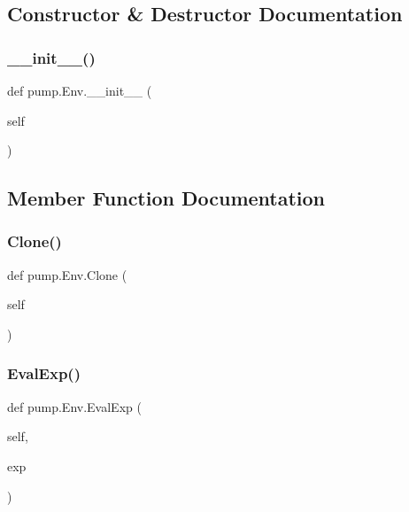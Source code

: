 \subsection{Constructor \& Destructor Documentation}
\mbox{\label{classpump_1_1_env_a803732618a49ab4a2edf098b78081611}} 
\subsubsection{\texorpdfstring{\_\_init\_\_()}{\_\_init\_\_()}}
{\footnotesize\ttfamily def pump.\+Env.\+\_\+\+\_\+init\+\_\+\+\_\+ (\begin{DoxyParamCaption}\item[{}]{self }\end{DoxyParamCaption})}



\subsection{Member Function Documentation}
\mbox{\label{classpump_1_1_env_a4c1b156cfa4aec708746bbe07dae5f1a}} 
\subsubsection{\texorpdfstring{Clone()}{Clone()}}
{\footnotesize\ttfamily def pump.\+Env.\+Clone (\begin{DoxyParamCaption}\item[{}]{self }\end{DoxyParamCaption})}

\mbox{\label{classpump_1_1_env_a29fa1ceb1f7c22e8e982133f4808317f}} 
\subsubsection{\texorpdfstring{EvalExp()}{EvalExp()}}
{\footnotesize\ttfamily def pump.\+Env.\+Eval\+Exp (\begin{DoxyParamCaption}\item[{}]{self,  }\item[{}]{exp }\end{DoxyParamCaption})}

